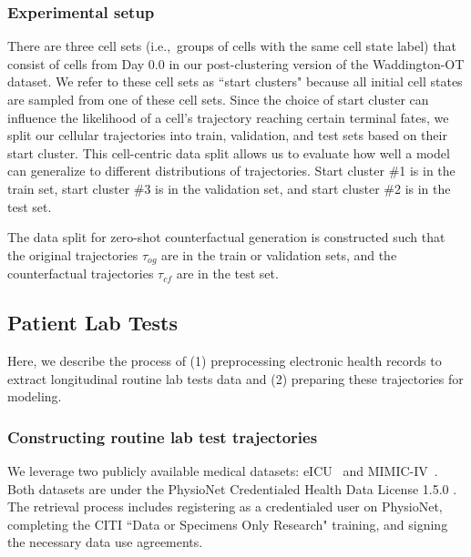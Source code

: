 \subsubsection{Experimental setup}

%
There are three cell sets (i.e.,~groups of cells with the same cell state label) that consist of cells from Day 0.0 in our post-clustering version of the Waddington-OT dataset. We refer to these cell sets as ``start clusters" because all initial cell states are sampled from one of these cell sets. Since the choice of start cluster can influence the likelihood of a cell's trajectory reaching certain terminal fates, we split our cellular trajectories into train, validation, and test sets based on their start cluster. This cell-centric data split allows us to evaluate how well a model can generalize to different distributions of trajectories. Start cluster \#1 is in the train set, start cluster \#3 is in the validation set, and start cluster \#2 is in the test set.


%
The data split for zero-shot counterfactual generation is constructed such that the original trajectories $\tau_{og}$ are in the train or validation sets, and the counterfactual trajectories $\tau_{cf}$ are in the test set.




\subsection{Patient Lab Tests}\label{appendix:labs}

Here, we describe the process of (1) preprocessing electronic health records to extract longitudinal routine lab tests data and (2) preparing these trajectories for modeling.



\subsubsection{Constructing routine lab test trajectories}

We leverage two publicly available medical datasets: eICU~\cite{pollard2018eicu} and MIMIC-IV~\cite{johnson2024mimic, johnson2023mimic, goldberger2000physiobank}. Both datasets are under the PhysioNet Credentialed Health Data License 1.5.0 \cite{mimiciv_license}. The retrieval process includes registering as a credentialed user on PhysioNet, completing the CITI ``Data or Specimens Only Research" training, and signing the necessary data use agreements.

